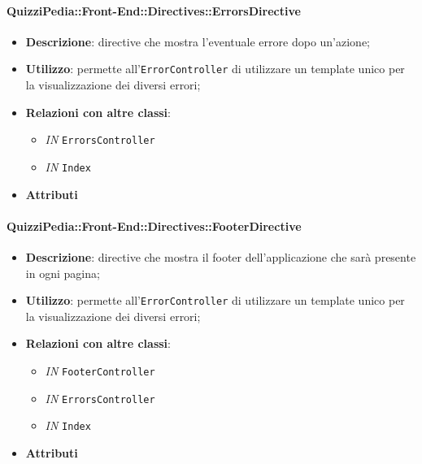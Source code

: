 \paragraph{QuizziPedia::Front-End::Directives::ErrorsDirective}
\begin{itemize}
	\item \textbf{Descrizione}: directive che mostra l'eventuale errore dopo un'azione;
	\item \textbf{Utilizzo}: permette all'\texttt{ErrorController} di utilizzare un template unico per la visualizzazione dei diversi errori;
	\item \textbf{Relazioni con altre classi}:
	\begin{itemize}
		\item \textit{IN} \texttt{ErrorsController}
		\item \textit{IN} \texttt{Index}
	\end{itemize}
	\item \textbf{Attributi}
\end{itemize}

\paragraph{QuizziPedia::Front-End::Directives::FooterDirective}
\begin{itemize}
	\item \textbf{Descrizione}: directive che mostra il footer dell'applicazione che sarà presente in ogni pagina;
	\item \textbf{Utilizzo}: permette all'\texttt{ErrorController} di utilizzare un template unico per la visualizzazione dei diversi errori;
	\item \textbf{Relazioni con altre classi}:
	\begin{itemize}
		\item \textit{IN} \texttt{FooterController}
		\item \textit{IN} \texttt{ErrorsController}
		\item \textit{IN} \texttt{Index}
	\end{itemize}
	\item \textbf{Attributi}
\end{itemize}

